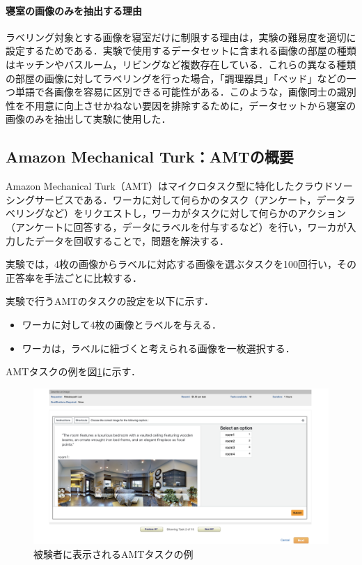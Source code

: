 \documentclass[a4paper,11pt]{jreport}
\begin{document}
\paragraph{寝室の画像のみを抽出する理由}
ラベリング対象とする画像を寝室だけに制限する理由は，実験の難易度を適切に設定するためである．実験で使用するデータセットに含まれる画像の部屋の種類はキッチンやバスルーム，リビングなど複数存在している．これらの異なる種類の部屋の画像に対してラベリングを行った場合，「調理器具」「ベッド」などの一つ単語で各画像を容易に区別できる可能性がある．このような，画像同士の識別性を不用意に向上させかねない要因を排除するために，データセットから寝室の画像のみを抽出して実験に使用した．

\subsection{Amazon Mechanical Turk：AMTの概要}

Amazon Mechanical Turk（AMT）はマイクロタスク型に特化したクラウドソーシングサービスである．ワーカに対して何らかのタスク（アンケート，データラベリングなど）をリクエストし，ワーカがタスクに対して何らかのアクション（アンケートに回答する，データにラベルを付与するなど）を行い，ワーカが入力したデータを回収することで，問題を解決する．

実験では，4枚の画像からラベルに対応する画像を選ぶタスクを100回行い，その正答率を手法ごとに比較する．

実験で行うAMTのタスクの設定を以下に示す．

\begin{itemize}
  \item ワーカに対して4枚の画像とラベルを与える．
  \item ワーカは，ラベルに紐づくと考えられる画像を一枚選択する．
\end{itemize}

AMTタスクの例を図\ref{fig:amt_example}に示す．

\begin{figure}[H]
  \centering
  \includegraphics[width=\linewidth]{figures/amt.png}
  \caption{被験者に表示されるAMTタスクの例}
  \label{fig:amt_example}
\end{figure}
\end{document}
